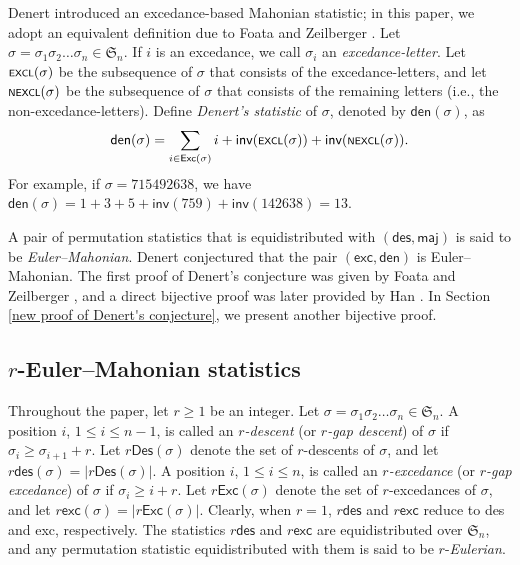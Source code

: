 \documentclass[12pt]{article}
\begin{document}
Denert \cite{Denert-1990} introduced an excedance-based Mahonian statistic;
in this paper, we adopt an equivalent definition due to  Foata and Zeilberger \cite{Foata-1990}.
Let $\sigma=\sigma_{1}\sigma_{2}\ldots \sigma_{n}\in\mathfrak{S}_{n}$.
If $i$ is an excedance,
we call $\sigma_{i}$ an \emph{excedance-letter}.
Let $\textsf{\scriptsize{EXCL}}(\sigma)$
be the subsequence of $\sigma$ that consists of the excedance-letters,
and let $\textsf{\scriptsize{NEXCL}}(\sigma)$ be the subsequence of $\sigma$  that consists of the remaining letters (i.e., the non-excedance-letters).
Define \emph{Denert's statistic} of $\sigma$, denoted by $\textsf{den}(\sigma)$, as
$$\textsf{den}(\sigma)=\sum_{i\in\textsf{Exc}(\sigma)}i+\textsf{inv}(\textsf{\scriptsize{EXCL}}(\sigma))+
\textsf{inv}(\textsf{\scriptsize{NEXCL}}(\sigma)).$$
For example, if  $\sigma=715492638$, 
we have 
$\textsf{den}(\sigma)=1+3+5+\textsf{inv}(759)+\textsf{inv}(142638)=13$.

A pair of permutation statistics that is equidistributed with $(\textsf{des},\textsf{maj})$ is said to be \emph{Euler--Mahonian}.
Denert \cite{Denert-1990} conjectured that the pair $(\textsf{exc},\textsf{den})$ is Euler--Mahonian.
The first proof of Denert's conjecture was given by Foata and Zeilberger \cite{Foata-1990},
and a direct bijective proof was later provided by Han \cite{Han-1990-direct}.
In Section \ref{new proof of Denert's conjecture}, we present another bijective proof.
\subsection{$r$-Euler--Mahonian statistics} 
Throughout the paper, let $r\geq1$ be an integer.
Let $\sigma=\sigma_{1}\sigma_{2}\ldots\sigma_{n}\in\mathfrak{S}_{n}$. 
A position $i$, $1\leq i\leq n-1$, is called an \emph{$r$-descent} (or \emph{$r$-gap descent}) of $\sigma$
if $\sigma_{i}\geq\sigma_{i+1}+r$.
Let $r\textsf{Des}(\sigma)$ denote the set  of $r$-descents of $\sigma$,
and let $r\textsf{des}(\sigma)=|r\textsf{Des}(\sigma)|$.
A position $i$, $1\leq i\leq n$, is called 
an \emph{$r$-excedance} (or \emph{$r$-gap excedance}) of $\sigma$ if $\sigma_{i}\geq i+r$.
Let $r\textsf{Exc}(\sigma)$ denote the set of $r$-excedances of $\sigma$,
and let $r\textsf{exc}(\sigma)=|r\textsf{Exc}(\sigma)|$.
Clearly, when $r=1$, $r\textsf{des}$ and $r\textsf{exc}$ reduce to \textsf{des} and \textsf{exc}, respectively.
The statistics $r\textsf{des}$ and $r\textsf{exc}$ are equidistributed over $\mathfrak{S}_{n}$,
and any permutation statistic equidistributed with them is said to be $r$-\emph{Eulerian}.
\end{document}
